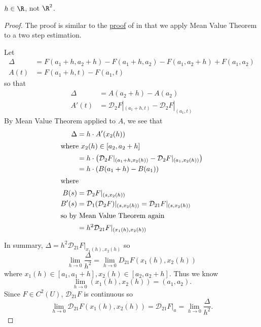 \documentclass[a4paper]{article}
\newcommand*{\D}{\mathcal{D}}
\theoremstyle{definition}
\begin{document}
\begin{note}
  \(h \in \R\), not \(\R^2\).
\end{note}

\begin{proof}
  The proof is similar to the \hyperref[proof:C1 implies differentiability]{proof} of  in that we apply Mean Value Theorem to a two step estimation.
   \begin{center}
  \end{center}
 Let
  \begin{align*}
    \Delta &= F(a_1 + h, a_2 + h) - F(a_1 + h, a_2) - F(a_1, a_2 + h) + F(a_1, a_2) \\
    A(t) &= F(a_1 + h, t) - F(a_1, t)
  \end{align*}
  so that
  \begin{align*}
    \Delta &= A(a_2 + h) - A(a_2) \\
    A'(t) &= \D_2 F|_{(a_1 + h, t)} - \D_2 F|_{(a_1, t)}
  \end{align*}
  By Mean Value Theorem applied to \(A\), we see that
  \begin{align*}
    \Delta &= h \cdot A'(x_2(h)) \\
    \intertext{where \(x_2(h) \in [a_2, a_2 + h]\)}
           &= h \cdot \left( \D_2 F|_{(a_1 + h, x_2(h))} - \D_2 F|_{(a_1, x_2(h))} \right) \\
           &= h \cdot (B(a_1 + h) - B(a_1)) \\
    \intertext{where}
    B(s) &= \D_2 F|_{(s, x_2(h))} \\
    B'(s) &= \D_1 (\D_2 F)|_{(s, x_2(h))} = \D_{21} F|_{(s, x_2(h))} \\
    \intertext{so by Mean Value Theorem again}
           &= h^2 \D_{21} F|_{(x_1(h), x_2(h))}
  \end{align*}

  In summary, \(\Delta = h^2 \D_{21} F|_{x_1(h), x_2(h)}\) so
  \[
    \lim_{h \to 0} \frac{\Delta}{h^2} = \lim_{h \to 0} D_{21} F(x_1(h), x_2(h))
  \]
  where \(x_1(h) \in [a_1, a_1 + h], x_2(h) \in [a_2, a_2 + h]\). Thus we know
  \[
    \lim_{h \to 0} (x_1(h), x_2(h)) = (a_1, a_2).
  \]
  Since \(F \in C^2(U)\), \(\D_{21} F\) is continuous so
  \[
    \lim_{h \to 0} \D_{21} F(x_1(h), x_2(h)) = \D_{21} F|_a = \lim_{h \to 0} \frac{\Delta}{h^2}.
  \]
\end{proof}
\end{document}
